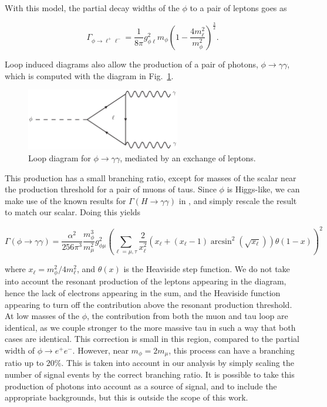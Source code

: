 With this model, the partial decay widths of the $\phi$ to a pair of leptons goes as

\begin{equation}
    \Gamma_{\phi \rightarrow \ell^+ \ell^-} = \frac{1}{8\pi} g_{\phi\ell}^2 m_\phi \left(1-\frac{4m_\ell^2}{m_\phi^2}\right)^{\frac{3}{2}}\textrm{.}
\end{equation}

Loop induced diagrams also allow the production of a pair of photons, $\phi \rightarrow \gamma \gamma$, which is computed with the diagram in Fig.~\ref{fig:phi_gammagamma_loop}.

\begin{figure}[h]
    \centering
    \includegraphics[width = 0.6\textwidth]{Figures/feynman_diagrams/phi_gammagamma}
    \caption{Loop diagram for $\phi \rightarrow \gamma \gamma$, mediated by an exchange of leptons.}
    \label{fig:phi_gammagamma_loop}
\end{figure}

\noindent This production has a small branching ratio, except for masses of the scalar near the production threshold for a pair of muons of taus.
Since $\phi$ is Higgs-like, we can make use of the known results for $\Gamma\left(H \rightarrow \gamma \gamma\right)$ in \cite{Djouadi:2005gi}, and simply rescale the result to match our scalar.
Doing this yields

\begin{equation}
    \Gamma\left(\phi \rightarrow \gamma \gamma\right) = \frac{\alpha^2}{256 \pi^3} \frac{m_\phi^3}{m_\mu^2} g_{\phi \mu}^2 \left( \sum_{\ell = \mu, \tau} \frac{2}{x_\ell^2}\left( x_\ell + (x_\ell-1) \arcsin^2\left( \sqrt{x_\ell} \right) \right) \theta(1-x) \right)^2
\end{equation}

\noindent where $x_\ell = m_\phi^2 / 4 m_\ell^2$, and $\theta(x)$ is the Heaviside step function.
We do not take into account the resonant production of the leptons appearing in the diagram, hence the lack of electrons appearing in the sum, and the Heaviside function appearing to turn off the contribution above the resonant production threshold.
At low masses of the $\phi$, the contribution from both the muon and tau loop are identical, as we couple stronger to the more massive tau in such a way that both cases are identical.
This correction is small in this region, compared to the partial width of $\phi \rightarrow e^+ e^-$.
However, near $m_\phi = 2m_\mu$, this process can have a branching ratio up to $20\%$.
This is taken into account in our analysis by simply scaling the number of signal events by the correct branching ratio.
It is possible to take this production of photons into account as a source of signal, and to include the appropriate backgrounds, but this is outside the scope of this work.

